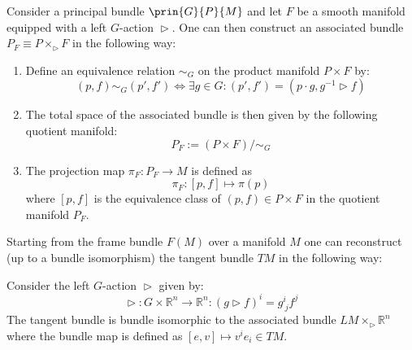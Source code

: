 	\begin{construct}
		Consider a principal bundle $\prin{G}{P}{M}$ and let $F$ be a smooth manifold equipped with a left $G$-action $\vartriangleright$. One can then construct an associated bundle $P_F \equiv P \times_\vartriangleright F$ in the following way:
		\begin{enumerate}
			\item Define an equivalence relation $\sim_G$ on the product manifold $P\times F$ by:
			\begin{equation}
				\label{diff:prin:associated_bundle_equivalence}
				(p, f)\sim_G (p', f')\iff \exists g\in G: (p', f') = (p\cdot g, g^{-1}\vartriangleright f)
			\end{equation}
			\item The total space of the associated bundle is then given by the following quotient manifold:
			\begin{equation}
				P_F := (P\times F)/\sim_G
			\end{equation}
			\item The projection map $\pi_F:P_F\rightarrow M$ is defined as
			\begin{equation}
				\pi_F:[p, f]\mapsto \pi(p)
			\end{equation}
			where $[p, f]$ is the equivalence class of $(p, f)\in P\times F$ in the quotient manifold $P_F$.
		\end{enumerate}
	\end{construct}
	
	\begin{example}
		Starting from the frame bundle $F(M)$ over a manifold $M$ one can reconstruct (up to a bundle isomorphism) the tangent bundle $TM$ in the following way:
		
		Consider the left $G$-action $\vartriangleright$ given by:
		\begin{equation}
			\vartriangleright:G\times\mathbb{R}^n\rightarrow\mathbb{R}^n : (g\vartriangleright f)^i = g^i_{\ j}f^j
		\end{equation}
		The tangent bundle is bundle isomorphic to the associated bundle $LM\times_\vartriangleright \mathbb{R}^n$ where the bundle map is defined as $[e, v]\mapsto v^ie_i \in TM$.
	\end{example}
	
